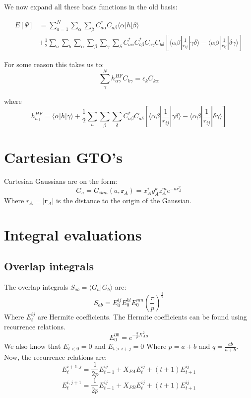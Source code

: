 \documentclass[a4paper,10pt, twocolumn]{article}
\newcommand{\rvec}{\mathbf{r}}
\newcommand{\overlap}[2]{\langle {#1}|{#2} \rangle}
\begin{document}
We now expand all these basis functions in the old basis:

\begin{align}
	E[\Psi] &= \sum_{a=1}^N \sum_\alpha \sum_\beta C_{a\alpha}^* C_{a\beta}\langle \alpha |h|\beta\rangle
	\nonumber \\
	&+
	\frac{1}{2} \sum_a \sum_b \sum_\alpha \sum_\beta \sum_\gamma \sum_\delta 
	C^*_{a\alpha} C^*_{b\beta} C_{a\gamma} C_{b\delta}
	\left[  \langle \alpha\beta |\frac{1}{r_{ij}}|\gamma\delta \rangle - \langle \alpha\beta | \frac{1}{r_{ij} }| \delta\gamma \rangle \right]
\end{align}

For some reason this takes us to:
\begin{equation}
	\sum_\gamma^N h_{\alpha\gamma}^{HF} C_{k\gamma} = \epsilon_k C_{k\alpha}
\end{equation}

where 
\begin{equation}
	h_{a\gamma}^{HF} = \langle \alpha |h|\gamma\rangle + \frac{1}{2}\sum_a\sum_\beta\sum_\delta  C^*_{a\beta}C_{a\delta} \left[ 
	\langle\alpha \beta|\frac{1}{r_{ij}}| \gamma \delta \rangle
	-
	\langle\alpha \beta|\frac{1}{r_{ij}}| \delta \gamma \rangle
	\right]
\end{equation}

\section{Cartesian GTO's}
Cartesian Gaussians are on the form:
\begin{equation}
	G_a = G_{ikm}(a, \rvec_A) = x^i_A y^k_A z^m_A e^{-ar^2_A}
\end{equation}
Where $r_A = |\rvec_A|$ is the distance to the origin of the Gaussian.

\section{Integral evaluations}
\subsection{Overlap integrals}

The overlap integrals $S_{ab} = \overlap{G_a}{G_b}$ are:
\begin{equation}
	S_{ab} = E_0^{ij}E_0^{kl}E_0^{mn}\left(\frac{\pi}{p}\right)^{\frac{3}{2}}
\end{equation}
Where $E_t^{ij}$ are Hermite coefficients. 
The Hermite coefficients can be found using recurrence relations. 
\begin{equation}
	E_0^{00} = e^{-\frac{q}{p}X_{AB}^2}
\end{equation}
We also know that $E_{t<0} = 0$ and $E_{t>i+j} = 0$
Where $p = a+b$ and $q = \frac{ab}{a+b}$.
Now, the recurrence relations are:
\begin{equation}
	E_t^{i+1,j} = \frac{1}{2p}E_{t-1}^{ij} + X_{PA}E_t^{ij} + (t+1) E_{t+1}^{ij}
\end{equation}
\begin{equation}
	E_t^{i, j+1} = \frac{1}{2p}E_{t-1}^{ij}+X_{PB}E_t^{ij} + (t+1)E_{t+1}^{ij}
\end{equation}
\end{document}
